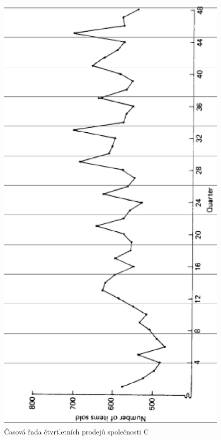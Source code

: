 \begin{figure}[htp]
\centering
\includegraphics[scale = 0.50]{pictures/figure_5_4.eps}
\caption{Časová řada čtvrtletních prodejů společnosti C}
\label{figure_5_4}
\end{figure}

